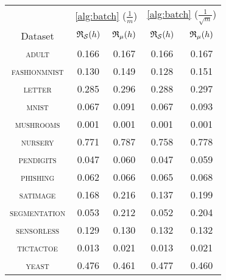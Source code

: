 \begin{tabular}{c|cc|cc}
\toprule
 & \multicolumn{2}{c}{\cref{alg:batch} {\small ($\frac{1}{m}$)}} & \multicolumn{2}{c}{\cref{alg:batch} {\small ($\frac{1}{\sqrt{m}}$)}} \\
Dataset & {\scriptsize $\mathfrak{R}_{\mathcal{S}}(h)$} & {\scriptsize $\mathfrak{R}_{\mu}(h)$} & {\scriptsize $\mathfrak{R}_{\mathcal{S}}(h)$} & {\scriptsize $\mathfrak{R}_{\mu}(h)$} \\
\midrule
\textsc{\footnotesize adult} & 0.166 & 0.167 & 0.166 & 0.167 \\
\textsc{\footnotesize fashionmnist} & 0.130 & 0.149 & 0.128 & 0.151 \\
\textsc{\footnotesize letter} & 0.285 & 0.296 & 0.288 & 0.297 \\
\textsc{\footnotesize mnist} & 0.067 & 0.091 & 0.067 & 0.093 \\
\textsc{\footnotesize mushrooms} & 0.001 & 0.001 & 0.001 & 0.001 \\
\textsc{\footnotesize nursery} & 0.771 & 0.787 & 0.758 & 0.778 \\
\textsc{\footnotesize pendigits} & 0.047 & 0.060 & 0.047 & 0.059 \\
\textsc{\footnotesize phishing} & 0.062 & 0.066 & 0.065 & 0.068 \\
\textsc{\footnotesize satimage} & 0.168 & 0.216 & 0.137 & 0.199 \\
\textsc{\footnotesize segmentation} & 0.053 & 0.212 & 0.052 & 0.204 \\
\textsc{\footnotesize sensorless} & 0.129 & 0.130 & 0.132 & 0.132 \\
\textsc{\footnotesize tictactoe} & 0.013 & 0.021 & 0.013 & 0.021 \\
\textsc{\footnotesize yeast} & 0.476 & 0.461 & 0.477 & 0.460 \\
\bottomrule
\end{tabular}
